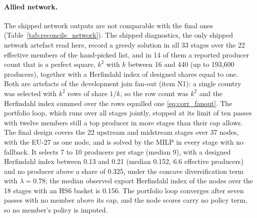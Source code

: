 \paragraph{Allied network.} The shipped network outputs are not comparable with the final ones
(Table~\ref{tab:reconcile_network}). The shipped diagnostics, the only shipped network artefact
read here, record a greedy solution in all 33 stages over the 22 effective members of the
hand-picked list, and in 14 of them a reported producer count that is a perfect square, $k^2$
with $k$ between 16 and 440 (up to 193{,}600 producers), together with a Herfindahl index of
designed shares equal to one. Both are artefacts of the development join fan-out (item N1): a
single country was selected with $k^2$ rows of share $1/k$, so the row count was $k^2$ and the
Herfindahl index summed over the rows equalled one \eqref{eq:corr_fanout}. The portfolio loop,
which runs over all stages jointly, stopped at its limit of ten passes with twelve members still a
top producer in more stages than their cap allows. The final design covers the 22 upstream and
midstream stages over 37 nodes, with the EU-27 as one node, and is solved by the MILP in every
stage with no fallback. It selects 7 to 10 producers per stage (median 9), with a designed
Herfindahl index between 0.13 and 0.21 (median 0.152, 6.6 effective producers) and no producer
above a share of 0.325, under the concave diversification term with $\lambda=0.78$; the median
observed export Herfindahl index of the nodes over the 18 stages with an HS6 basket is 0.156. The
portfolio loop converges after seven passes with no member above its cap, and the node scores
carry no policy term, so no member's policy is imputed.



